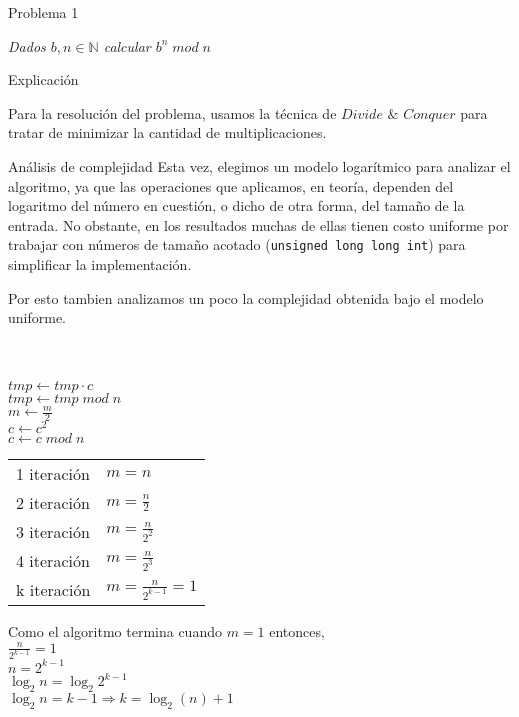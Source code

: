 \begin{section}{Problema 1}

	\textit{Dados $b,n \in \mathbb{N} $ calcular $b^n\; mod\; n$}

	\begin{subsection}{Explicación}

		Para la resolución del problema, usamos la técnica de $Divide$ $\&$ $Conquer$ para tratar de minimizar la cantidad
	de multiplicaciones. 

		\begin{subsubsection}{Análisis de complejidad}
		Esta vez, elegimos un modelo logarítmico para analizar el algoritmo, ya que las operaciones que aplicamos, 
		en teoría, dependen del logaritmo del número en cuestión, o dicho de otra forma, del tamaño de la entrada.
		No obstante, en los resultados muchas de ellas tienen costo uniforme por trabajar con números de tamaño acotado (\texttt{unsigned long long int}) para simplificar la implementación.

		Por esto tambien analizamos un poco la complejidad obtenida bajo el modelo uniforme. \\

		\begin{pseudo}
			 \\
			\tab {} \\
			\tab \tab $tmp \leftarrow tmp \cdot c$ \\
			\tab \tab $tmp \leftarrow tmp\; mod\; n$ \\
			\tab $m \leftarrow \frac{m}{2}$ \\
			\tab $c \leftarrow c^2$ \\
			\tab $c \leftarrow c\; mod\; n$
			
		\end{pseudo}

		\begin{tabular}{l l}
			1 iteración & $m = n$ \\
			2 iteración & $m = \frac{n}{2}$ \\
			3 iteración & $m = \frac{n}{2^2}$ \\
			4 iteración & $m = \frac{n}{2^3}$ \\
			k iteración & $m = \frac{n}{2^{k-1}} = 1$  
		\end{tabular}

		Como el algoritmo termina cuando $m=1$ entonces, \\
			$\frac{n}{2^{k-1}} = 1$ \\
			$n = 2^{k-1}$ \\
			$\log_2 n = \log_2 2^{k-1}$ \\
			$\log_2 n = k-1 \Rightarrow k = \log_2( n )+1 $ \\


\end{subsubsection}
\end{subsection}
\end{section}
